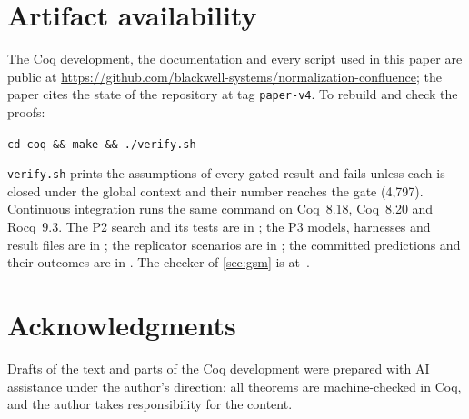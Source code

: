 
\section*{Artifact availability}

The Coq development, the documentation and every script used in this paper are public at
\url{https://github.com/blackwell-systems/normalization-confluence}; the paper cites the state of the
repository at tag \texttt{paper-v4}. To rebuild and check the
proofs:
\begin{center}
\texttt{cd coq \&\& make \&\& ./verify.sh}
\end{center}
\texttt{verify.sh} prints the assumptions of every gated result and fails unless each is closed under the
global context and their number reaches the gate (4{,}797). Continuous integration runs the same
command on Coq~8.18, Coq~8.20 and Rocq~9.3. The P2 search and its tests are in
; the P3 models, harnesses and result files are in
; the replicator scenarios are in
; the committed predictions and their outcomes are in
. The checker of \cref{sec:gsm} is at~\cite{gsm}.

\section*{Acknowledgments}

Drafts of the text and parts of the Coq development were prepared with AI assistance under the author's
direction; all theorems are machine-checked in Coq, and the author takes responsibility for the content.
